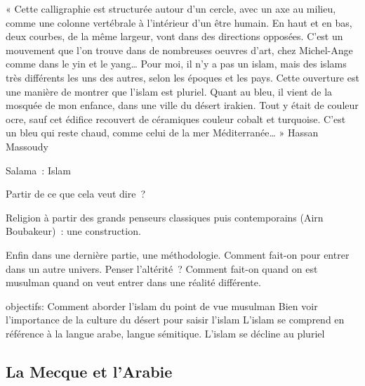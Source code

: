 « Cette calligraphie est structurée autour d'un cercle, avec un axe au
milieu, comme une colonne vertébrale à l'intérieur d'un être humain. En
haut et en bas, deux courbes, de la même largeur, vont dans des
directions opposées. C'est un mouvement que l'on trouve dans de
nombreuses  oeuvres d'art, chez Michel-Ange comme dans le yin et le
yang\ldots{} Pour moi, il n'y a pas un islam, mais des islams très
différents les uns des autres, selon les époques et les pays. Cette
ouverture est une manière de montrer que l'islam est pluriel. Quant au
bleu, il vient de la mosquée de mon enfance, dans une ville du désert
irakien. Tout y était de couleur ocre, sauf cet édifice recouvert de
céramiques couleur cobalt et turquoise. C'est un bleu qui reste chaud,
comme celui de la mer Méditerranée\ldots{} » Hassan Massoudy



Salama~: Islam

Partir de ce que cela veut dire~?

Religion à partir des grands penseurs classiques puis contemporains
(Airn Boubakeur)~: une construction.

Enfin dans une dernière partie, une méthodologie. Comment fait-on pour
entrer dans un autre univers. Penser l'altérité~? Comment fait-on quand
on est musulman quand on veut entrer dans une réalité différente.


objectifs:
Comment aborder l'islam du point de vue
musulman
Bien voir l'importance de la culture du
désert pour saisir l'islam
L'islam se comprend en référence à la
langue arabe, langue sémitique.
L'islam se décline au
pluriel


\subsection{La Mecque et l'Arabie}

